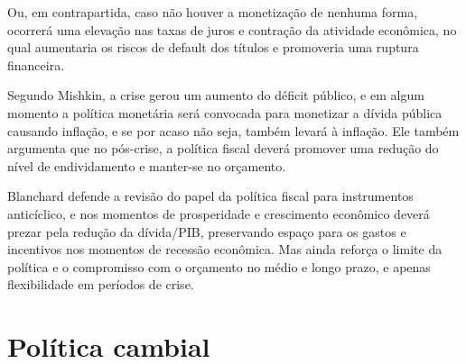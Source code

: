 \documentclass[report]{uftex}
\begin{document}
Ou, em contrapartida, caso não houver a monetização de nenhuma forma, ocorrerá uma elevação nas taxas de juros e contração da atividade econômica, no qual aumentaria os riscos de default dos títulos e promoveria uma ruptura financeira. %

Segundo Mishkin, a crise gerou um aumento do déficit público, e em algum momento a política monetária será convocada para monetizar a dívida pública causando inflação, e se por acaso não seja, também levará à inflação. Ele também argumenta que no pós-crise, a política fiscal deverá promover uma redução do nível de endividamento e manter-se no orçamento. 

Blanchard defende a revisão do papel da política fiscal para instrumentos anticíclico, e nos momentos de prosperidade e crescimento econômico deverá prezar pela redução da dívida/PIB, preservando espaço para os gastos e incentivos nos momentos de recessão econômica. Mas ainda reforça o limite da política e o compromisso com o orçamento no médio e longo prazo, e apenas flexibilidade em períodos de crise.

\section{Política cambial}
\end{document}
